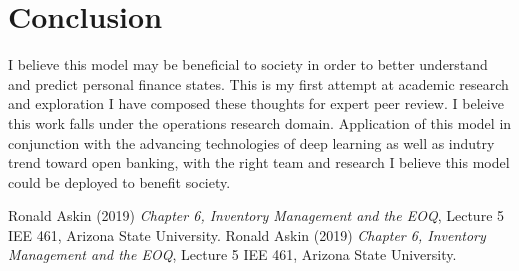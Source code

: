 \documentclass{article}
\begin{document}
\section{Conclusion}
I believe this model may be beneficial to society in order to better understand and predict personal finance states. This is my first attempt at academic research and exploration I have composed these thoughts for expert peer review. I beleive this work falls under the operations research domain. Application of this model in conjunction with the advancing technologies of deep learning as well as indutry trend toward open banking, with the right team and research I believe this model could be deployed to benefit society.  



 \begin{thebibliography}{1}

 	Ronald Askin (2019) \emph{Chapter 6, Inventory Management and the EOQ}, Lecture 5 IEE 461, Arizona State University.
 	Ronald Askin (2019) \emph{Chapter 6, Inventory Management and the EOQ}, Lecture 5 IEE 461, Arizona State University.

 \end{thebibliography}
\end{document}
